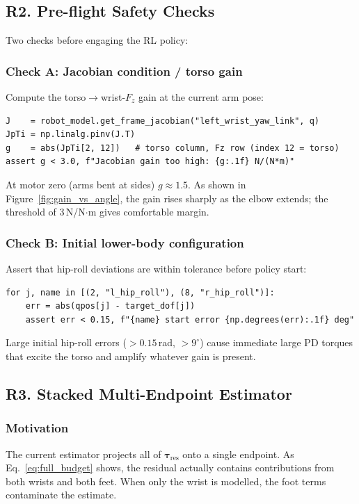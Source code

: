 \documentclass[11pt,a4paper]{article}
\newcommand{\btau}{\bm{\tau}}
\begin{document}
\subsection{R2. Pre-flight Safety Checks}
\label{sec:rec_preflight}

Two checks before engaging the RL policy:

\subsubsection*{Check A: Jacobian condition / torso gain}
Compute the torso$\to$wrist-$F_z$ gain at the current arm pose:
\begin{lstlisting}
J    = robot_model.get_frame_jacobian("left_wrist_yaw_link", q)
JpTi = np.linalg.pinv(J.T)
g    = abs(JpTi[2, 12])   # torso column, Fz row (index 12 = torso)
assert g < 3.0, f"Jacobian gain too high: {g:.1f} N/(N*m)"
\end{lstlisting}
At motor zero (arms bent at sides) $g \approx 1.5$.  As shown in
Figure~\ref{fig:gain_vs_angle}, the gain rises sharply as the elbow extends;
the threshold of 3\,N/N$\cdot$m gives comfortable margin.

\subsubsection*{Check B: Initial lower-body configuration}
Assert that hip-roll deviations are within tolerance before policy start:
\begin{lstlisting}
for j, name in [(2, "l_hip_roll"), (8, "r_hip_roll")]:
    err = abs(qpos[j] - target_dof[j])
    assert err < 0.15, f"{name} start error {np.degrees(err):.1f} deg"
\end{lstlisting}
Large initial hip-roll errors ($>0.15$\,rad, $>9^\circ$) cause immediate
large PD torques that excite the torso and amplify whatever gain is present.

\subsection{R3. Stacked Multi-Endpoint Estimator}
\label{sec:rec_stacked}

\subsubsection*{Motivation}
The current estimator projects all of $\btau_\text{res}$ onto a single
endpoint.  As Eq.~\eqref{eq:full_budget} shows, the residual actually
contains contributions from both wrists and both feet.  When only the wrist
is modelled, the foot terms contaminate the estimate.
\end{document}
